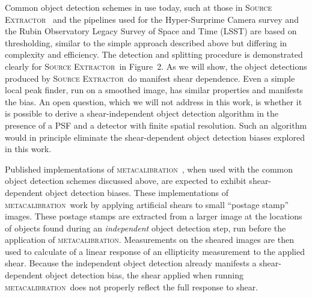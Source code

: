 \documentclass[iop, twocolappendix, appendixfloats, numberedappendix, apj]{hackemulateapj}
\newcommand{\mcal}{\textsc{metacalibration}}
\newcommand{\sx}{\textsc{Source Extractor}}
\begin{document}

Common object detection schemes in use today, such at those in \sx\
\citep{Bertin96} and the pipelines used for the Hyper-Surprime Camera survey
and the Rubin Observatory Legacy Survey of Space and Time (LSST)
\citep{BoschHSC2018,BoschLSST2018} are based on thresholding, similar to the
simple approach described above but differing in complexity and efficiency.
The detection and splitting procedure is demonstrated clearly for \sx\ in
\cite{Bertin96} Figure~2.  As we will show, the object detections
produced by \sx\ do manifest shear dependence.  Even a simple local peak
finder, run on a smoothed image, has similar properties and manifests the bias.
An open question, which we will not address in this work, is whether it is
possible to derive a shear-independent object detection algorithm in the
presence of a PSF and a detector with finite spatial resolution.  Such an
algorithm would in principle eliminate the shear-dependent object detection
biases explored in this work.

Published implementations of \mcal\
\citep[e.g.,][]{HuffMcal2017,SheldonMcal2017}, when used with the common object
detection schemes discussed above, are expected to exhibit shear-dependent
object detection biases. These implementations of \mcal\ work by applying
artificial shears to small ``postage stamp'' images. These postage stamps are
extracted from a larger image at the locations of objects found during an {\em
independent} object detection step, run before the application of \mcal.
Measurements on the sheared images are then used to calculate of a linear
response of an ellipticity measurement to the applied shear. Because the
independent object detection already manifests a shear-dependent object
detection bias, the shear applied when running \mcal\ does not properly reflect
the full response to shear.

\end{document}
